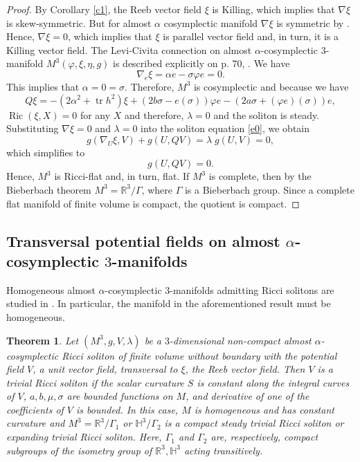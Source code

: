\documentclass[a4paper, twoside, 10pt]{article}
\numberwithin{equation}{section}
\newtheorem{theorem}{Theorem}[section]
\theoremstyle{definition}
\begin{document}
\begin{proof}
By Corollary \ref{c1}, the Reeb vector field 
$\xi$ is Killing, which implies that $\nabla \xi$ is skew-symmetric. But for almost $\alpha$ cosymplectic
manifold $\nabla \xi$ is symmetric by \cite{li2022ricci}. Hence,
 $\nabla \xi = 0$, which implies that $\xi$ is parallel 
 vector field and, in turn, it is a Killing vector field. 
  The Levi-Civita connection on almost $\alpha$-cosymplectic $3$-manifold $M^{3}(\varphi,\xi,\eta,g)$ is described explicitly
 on p. 70, \cite{perrone2018classification}. We have
$$\nabla_e\xi =\alpha e-\sigma \varphi e = 0.$$
This implies that $\alpha = 0 = \sigma$.
Therefore, $M^3$ is cosymplectic and because we have
$$ Q\xi=-(2\alpha^2+\operatorname{tr}h^2)\xi+(2b\sigma-e(\sigma))\varphi e-(2a\sigma+(\varphi e)(\sigma))e,$$  
$\operatorname{Ric}(\xi, X) = 0$ for any $X$ and therefore,  $\lambda = 0$ and the soliton is  steady. \\
Substituting $\nabla\xi=0$ and $\lambda=0$ into the soliton equation
\eqref{e0}, we obtain
\begin{equation*}
    g(\nabla_{U}\xi,V)+g(U,QV)= \lambda \; g(U,V) = 0,
\end{equation*}
which simplifies to
\begin{equation*}
    g(U,QV)= 0.
\end{equation*}
Hence, $M^3$ is Ricci-flat and, in turn, flat. If $M^3$ is complete, then by the Bieberbach theorem
$M^3=\mathbb{R}^3/\Gamma$, where $\Gamma$ is a Bieberbach group.
Since a complete flat manifold of finite volume is compact, the quotient
is compact.
\end{proof}

\subsection{Transversal potential fields on almost \texorpdfstring{$\alpha$}{alpha}-cosymplectic \texorpdfstring{$3$}{}-manifolds}


Homogeneous almost $\alpha$-cosymplectic $3$-manifolds admitting Ricci solitons are studied in \cite{li2022ricci}.
In particular, the manifold in the aforementioned result must be homogeneous.


\begin{theorem}\label{tr1}
Let $\left(M^3, g, V, \lambda \right)$ be a $3$-dimensional non-compact almost  $\alpha$-cosymplectic 
Ricci soliton of finite volume without boundary with the potential
field $V$, a unit vector field, transversal to $\xi$, the Reeb vector field. Then $V$ is a trivial Ricci soliton if the scalar curvature $S$
is constant along the integral curves of $V$,
$a, b, \mu, \sigma$  are  bounded functions on $M$, and derivative of one of the coefficients of $V$ is bounded. In this case, $M$ is homogeneous and has constant curvature and $M^3 = {\mathbb R}^3/{\Gamma}_1$ or ${\mathbb H}^3/{\Gamma}_2$ is a compact steady trivial Ricci soliton or expanding trivial Ricci soliton. Here, ${\Gamma}_1$ and ${\Gamma}_2$ are, respectively, compact subgroups of the isometry group of $\mathbb{R}^3, \mathbb{H}^3$  acting transitively. 
 \end{theorem}
 
\end{document}
